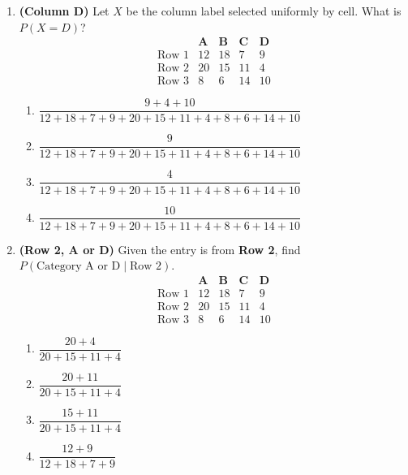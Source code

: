 \documentclass[12pt]{article}
\begin{document}
\begin{enumerate}[label=\textbf{S\arabic*.}]
\item \textbf{(Column D)} Let $X$ be the column label selected uniformly by cell. What is $P(X=D)$?
\[
\begin{array}{c|cccc}
  & \mathbf{A} & \mathbf{B} & \mathbf{C} & \mathbf{D} \\\hline
  \text{Row 1} & 12 & 18 & 7  & 9  \\
  \text{Row 2} & 20 & 15 & 11 & 4  \\
  \text{Row 3} & 8  & 6  & 14 & 10
\end{array}
\]
\begin{enumerate}[label=(\Alph*)]
\item $\dfrac{9+4+10}{12+18+7+9+20+15+11+4+8+6+14+10}$
\item $\dfrac{9}{12+18+7+9+20+15+11+4+8+6+14+10}$
\item $\dfrac{4}{12+18+7+9+20+15+11+4+8+6+14+10}$
\item $\dfrac{10}{12+18+7+9+20+15+11+4+8+6+14+10}$
\end{enumerate}

\item \textbf{(Row 2, A or D)} Given the entry is from \textbf{Row 2}, find $P(\text{Category A or D}\mid \text{Row 2})$.
\[
\begin{array}{c|cccc}
  & \mathbf{A} & \mathbf{B} & \mathbf{C} & \mathbf{D} \\\hline
  \text{Row 1} & 12 & 18 & 7  & 9  \\
  \text{Row 2} & 20 & 15 & 11 & 4  \\
  \text{Row 3} & 8  & 6  & 14 & 10
\end{array}
\]
\begin{enumerate}[label=(\Alph*)]
\item $\dfrac{20+4}{20+15+11+4}$
\item $\dfrac{20+11}{20+15+11+4}$
\item $\dfrac{15+11}{20+15+11+4}$
\item $\dfrac{12+9}{12+18+7+9}$
\end{enumerate}

\end{enumerate}
\end{document}
